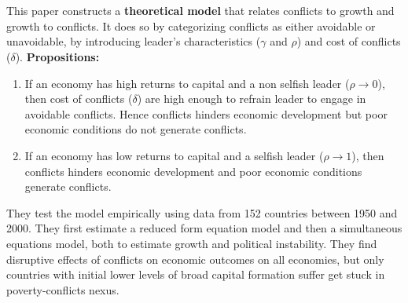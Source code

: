 \documentclass[12pt,a4paper,titlepage,english]{article}
\begin{document}
\section*{\cite{blomberg2006conflict}}
This paper constructs a \textbf{theoretical model} that relates conflicts to growth and growth to conflicts.
It does so by categorizing conflicts as either avoidable or unavoidable, by introducing leader's characteristics ($\gamma$ and $\rho$) and cost of conflicts ($\delta$). \textbf{Propositions: }
\begin{enumerate}
\item{If an economy has high returns to capital and a non selfish leader ($\rho\to0$), then cost of conflicts ($\delta$) are high enough to refrain leader to engage in avoidable conflicts. Hence conflicts hinders economic development but poor economic conditions do not generate conflicts. }
\item{If an economy has low returns to capital and a selfish leader ($\rho\to1$), then conflicts hinders economic development and poor economic conditions generate conflicts.}
\end{enumerate}
They test the model empirically using data from 152 countries between 1950 and 2000. They first estimate a reduced form equation model and then a simultaneous equations model, both to estimate growth and political instability.  They find disruptive effects of conflicts on economic outcomes on all economies, but only countries with initial lower levels of broad capital formation suffer get stuck in poverty-conflicts nexus. 
\end{document}
